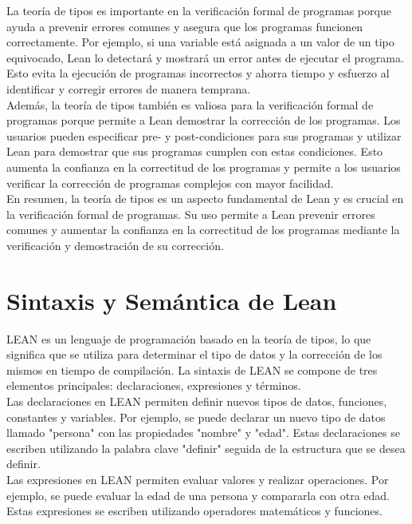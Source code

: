 \documentclass{article}
\begin{document}
La teoría de tipos es importante en la verificación formal de programas
porque ayuda a prevenir errores comunes y asegura que los programas
funcionen correctamente. Por ejemplo, si una variable está asignada a un
valor de un tipo equivocado, Lean lo detectará y mostrará un error antes de
ejecutar el programa. Esto evita la ejecución de programas incorrectos y
ahorra tiempo y esfuerzo al identificar y corregir errores de manera
temprana.\\

Además, la teoría de tipos también es valiosa para la verificación formal
de programas porque permite a Lean demostrar la corrección de los
programas. Los usuarios pueden especificar pre- y post-condiciones para
sus programas y utilizar Lean para demostrar que sus programas cumplen con
estas condiciones. Esto aumenta la confianza en la correctitud de los
programas y permite a los usuarios verificar la corrección de programas
complejos con mayor facilidad.\\

En resumen, la teoría de tipos es un aspecto fundamental de Lean y es
crucial en la verificación formal de programas. Su uso permite a Lean
prevenir errores comunes y aumentar la confianza en la correctitud de los
programas mediante la verificación y demostración de su corrección.

\section{Sintaxis y Semántica de Lean}
LEAN es un lenguaje de programación basado en la teoría de tipos,
lo que significa que se utiliza para determinar el tipo de datos
y la corrección de los mismos en tiempo de compilación.
La sintaxis de LEAN se compone de tres elementos principales: declaraciones,
expresiones y términos.\\

Las declaraciones en LEAN permiten definir nuevos tipos de datos,
funciones, constantes y variables. Por ejemplo,
se puede declarar un nuevo tipo de datos llamado "persona" con las propiedades
"nombre" y "edad". Estas declaraciones se escriben utilizando la palabra clave
"definir" seguida de la estructura que se desea definir.\\

Las expresiones en LEAN permiten evaluar valores y realizar operaciones. Por ejemplo, se puede evaluar la edad de una persona y compararla con otra edad. Estas expresiones se escriben utilizando operadores matemáticos y funciones.\\
\end{document}
